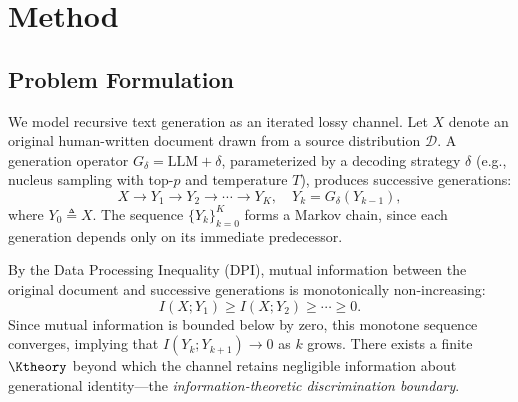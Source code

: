 \section{Method}
\label{sec:method}


\subsection{Problem Formulation}
\label{sec:formulation}

We model recursive text generation as an iterated lossy channel.
Let $X$ denote an original human-written document drawn from a source distribution $\mathcal{D}$.
A generation operator $G_\delta = \text{LLM} + \delta$, parameterized by a decoding strategy $\delta$ (e.g., nucleus sampling with top-$p$ and temperature $T$), produces successive generations:
\begin{equation}
  X \to Y_1 \to Y_2 \to \cdots \to Y_K, \quad Y_k = G_\delta(Y_{k-1}),
  \label{eq:markov}
\end{equation}
where $Y_0 \triangleq X$.
The sequence $\{Y_k\}_{k=0}^K$ forms a Markov chain, since each generation depends only on its immediate predecessor.

By the Data Processing Inequality (DPI), mutual information between the original document and successive generations is monotonically non-increasing:
\begin{equation}
  I(X; Y_1) \geq I(X; Y_2) \geq \cdots \geq 0.
  \label{eq:dpi}
\end{equation}
Since mutual information is bounded below by zero, this monotone sequence converges, implying that $I(Y_k; Y_{k+1}) \to 0$ as $k$ grows.
There exists a finite $\Ktheory$ beyond which the channel retains negligible information about generational identity---the \emph{information-theoretic discrimination boundary}.

